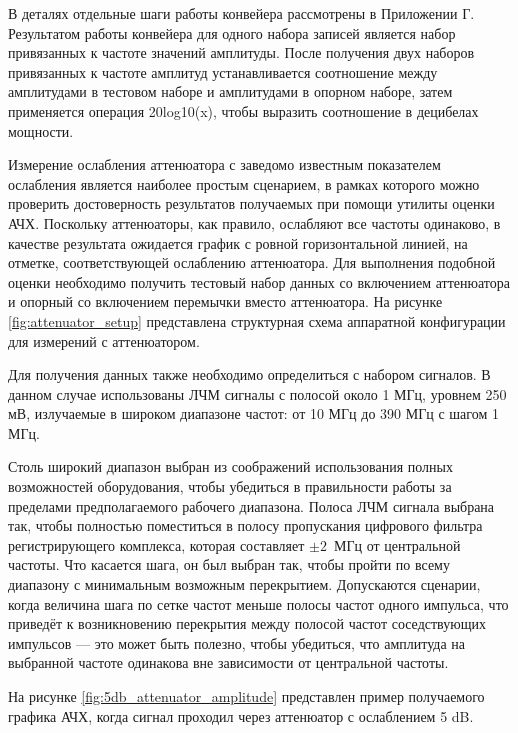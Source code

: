 \documentclass{report}
\begin{document}
В деталях отдельные шаги работы конвейера рассмотрены в Приложении Г. Результатом работы конвейера для одного набора записей является набор привязанных к частоте значений амплитуды. После получения двух наборов привязанных к частоте амплитуд устанавливается соотношение между амплитудами в тестовом наборе и амплитудами в опорном наборе, затем применяется операция 20log10(x), чтобы выразить соотношение в децибелах мощности.

Измерение ослабления аттенюатора с заведомо известным показателем ослабления является наиболее простым сценарием, в рамках которого можно проверить достоверность результатов получаемых при помощи утилиты оценки АЧХ. Поскольку аттенюаторы, как правило, ослабляют все частоты одинаково, в качестве результата ожидается график с ровной горизонтальной линией, на отметке, соответствующей ослаблению аттенюатора. Для выполнения подобной оценки необходимо получить тестовый набор данных со включением аттенюатора и опорный со включением перемычки вместо аттенюатора. На рисунке \ref{fig:attenuator_setup} представлена структурная схема аппаратной конфигурации для измерений с аттенюатором.


Для получения данных также необходимо определиться с набором сигналов. В данном случае использованы ЛЧМ сигналы с полосой около 1 МГц, уровнем 250 мВ, излучаемые в широком диапазоне частот: от 10 МГц до 390 МГц с шагом 1 МГц.

Столь широкий диапазон выбран из соображений использования полных возможностей оборудования, чтобы убедиться в правильности работы за пределами предполагаемого рабочего диапазона. Полоса ЛЧМ сигнала выбрана так, чтобы полностью поместиться в полосу пропускания цифрового фильтра регистрирующего комплекса, которая составляет $\pm 2$~МГц от центральной частоты. Что касается шага, он был выбран так, чтобы пройти по всему диапазону с минимальным возможным перекрытием. Допускаются сценарии, когда величина шага по сетке частот меньше полосы частот одного импульса, что приведёт к возникновению перекрытия между полосой частот соседствующих импульсов --- это может быть полезно, чтобы убедиться, что амплитуда на выбранной частоте одинакова вне зависимости от центральной частоты.

На рисунке \ref{fig:5db_attenuator_amplitude} представлен пример получаемого графика АЧХ, когда сигнал проходил через аттенюатор с ослаблением 5 dB.
\end{document}
